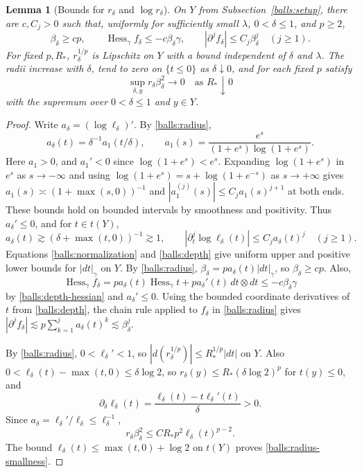 \documentclass[11pt,a4paper]{article}
\newtheorem{lemma}[theorem]{Lemma}
\theoremstyle{definition}
\theoremstyle{remark}
\numberwithin{equation}{section}
\begin{document}
\begin{lemma}[Bounds for $r_\delta$ and $\log r_\delta$]\label{balls:profiles}
On $Y$ from Subsection~\ref{balls:setup}, there are $c,C_j>0$ such
that, uniformly for sufficiently small $\lambda$, $0<\delta\leq1$,
and $p\geq2$,
\begin{equation}\label{balls:profile-estimates}
 \beta_\delta\geq c p,\qquad
 \operatorname{Hess}_\gamma f_\delta\leq-c\beta_\delta\gamma,
 \qquad |\partial^j f_\delta|\leq C_j\beta_\delta^j
 \quad(j\geq1).
\end{equation}
For fixed $p,R_*$, $r_\delta^{1/p}$ is Lipschitz on $Y$ with a bound
independent of $\delta$ and $\lambda$. The radii increase with
$\delta$, tend to zero on $\{t\leq0\}$ as $\delta\downarrow0$, and for
each fixed $p$ satisfy
\begin{equation}\label{balls:radius-smallness}
 \sup_{\delta,y}r_\delta\beta_\delta^2\longrightarrow0
 \quad\text{as }R_*\downarrow0
\end{equation}
with the supremum over $0<\delta\leq1$ and $y\in Y$.
\end{lemma}

\begin{proof}
Write $a_\delta=(\log\ell_\delta)'$. By \eqref{balls:radius},
\[
 a_\delta(t)=\delta^{-1}a_1(t/\delta),\qquad
 a_1(s)=\frac{e^s}{(1+e^s)\log(1+e^s)}.
\]
Here $a_1>0$, and $a_1'<0$ since $\log(1+e^s)<e^s$.
Expanding $\log(1+e^s)$ in $e^s$ as $s\to-\infty$ and using
$\log(1+e^s)=s+\log(1+e^{-s})$ as $s\to+\infty$ gives
$a_1(s)\asymp(1+\max(s,0))^{-1}$ and
$|a_1^{(j)}(s)|\le C_j a_1(s)^{j+1}$ at both ends.
These bounds hold on bounded intervals by smoothness and positivity.
Thus $a_\delta'\leq0$, and for $t\in t(Y)$,
\[
 a_\delta(t)\gtrsim(\delta+\max(t,0))^{-1}\gtrsim1,\qquad
 |\partial_t^j\log\ell_\delta(t)|\leq C_j a_\delta(t)^j
 \quad(j\geq1).
\]
Equations \eqref{balls:normalization} and \eqref{balls:depth} give
uniform upper and positive lower bounds for $|dt|_\gamma$ on $Y$.
By \eqref{balls:radius}, $\beta_\delta=p a_\delta(t)|dt|_\gamma$,
so $\beta_\delta\geq cp$. Also,
\[
 \operatorname{Hess}_\gamma f_\delta
   =p a_\delta(t)\operatorname{Hess}_\gamma t
          +p a_\delta'(t)\,dt\otimes dt
   \leq-c\beta_\delta\gamma
\]
by \eqref{balls:depth-hessian} and $a_\delta'\leq0$.
Using the bounded coordinate derivatives of $t$ from
\eqref{balls:depth}, the chain rule applied to $f_\delta$ in
\eqref{balls:radius} gives $|\partial^j f_\delta|\lesssim
p\sum_{k=1}^j a_\delta(t)^k\lesssim\beta_\delta^j$.

By \eqref{balls:radius}, $0<\ell_\delta'<1$, so
$|d(r_\delta^{1/p})|\leq R_*^{1/p}|dt|$ on $Y$.
Also $0<\ell_\delta(t)-\max(t,0)\leq\delta\log2$, so
$r_\delta(y)\leq R_*(\delta\log2)^p$ for $t(y)\leq0$, and
\[
 \partial_\delta\ell_\delta(t)
  =\frac{\ell_\delta(t)-t\ell_\delta'(t)}{\delta}>0.
\]
Since $a_\delta=\ell_\delta'/\ell_\delta\leq\ell_\delta^{-1}$,
\[
 r_\delta\beta_\delta^2
       \leq C R_*p^2\ell_\delta(t)^{p-2}.
\]
The bound $\ell_\delta(t)\leq\max(t,0)+\log2$ on $t(Y)$ proves
\eqref{balls:radius-smallness}.
\end{proof}
\end{document}
